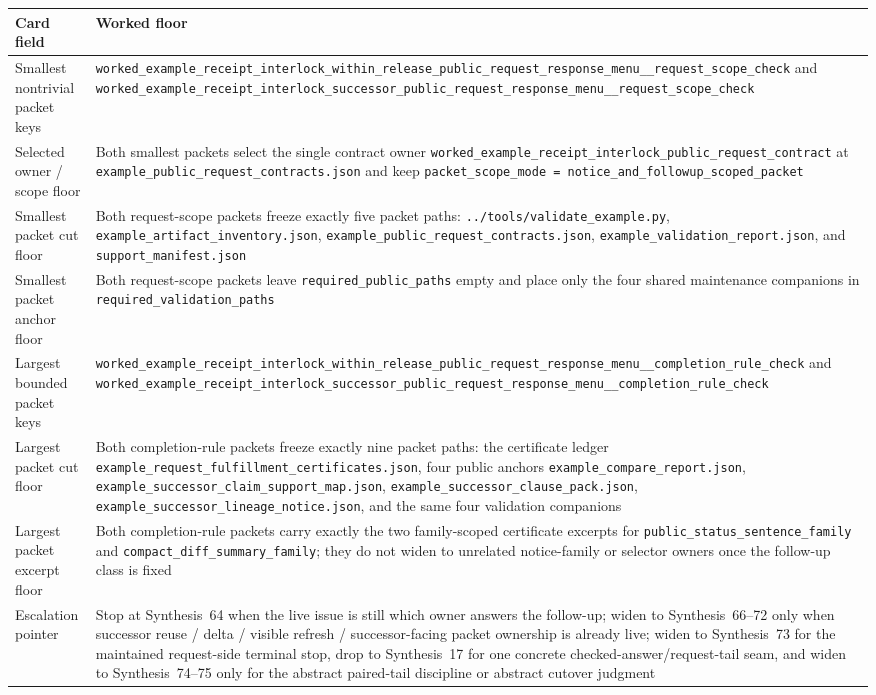 \documentclass[11pt]{article}
\begin{document}
\begin{table}[t]
\centering
\footnotesize
\begin{tabularx}{\linewidth}{@{}Z Y@{}}
\toprule
Card field & Worked floor \\
\midrule
Smallest nontrivial packet keys & \nolinkurl{worked_example_receipt_interlock_within_release_public_request_response_menu__request_scope_check} and \nolinkurl{worked_example_receipt_interlock_successor_public_request_response_menu__request_scope_check} \\
Selected owner / scope floor & Both smallest packets select the single contract owner \nolinkurl{worked_example_receipt_interlock_public_request_contract} at \nolinkurl{example_public_request_contracts.json} and keep \nolinkurl{packet_scope_mode = notice_and_followup_scoped_packet} \\
Smallest packet cut floor & Both request-scope packets freeze exactly five packet paths: \nolinkurl{../tools/validate_example.py}, \nolinkurl{example_artifact_inventory.json}, \nolinkurl{example_public_request_contracts.json}, \nolinkurl{example_validation_report.json}, and \nolinkurl{support_manifest.json} \\
Smallest packet anchor floor & Both request-scope packets leave \nolinkurl{required_public_paths} empty and place only the four shared maintenance companions in \nolinkurl{required_validation_paths} \\
Largest bounded packet keys & \nolinkurl{worked_example_receipt_interlock_within_release_public_request_response_menu__completion_rule_check} and \nolinkurl{worked_example_receipt_interlock_successor_public_request_response_menu__completion_rule_check} \\
Largest packet cut floor & Both completion-rule packets freeze exactly nine packet paths: the certificate ledger \nolinkurl{example_request_fulfillment_certificates.json}, four public anchors \nolinkurl{example_compare_report.json}, \nolinkurl{example_successor_claim_support_map.json}, \nolinkurl{example_successor_clause_pack.json}, \nolinkurl{example_successor_lineage_notice.json}, and the same four validation companions \\
Largest packet excerpt floor & Both completion-rule packets carry exactly the two family-scoped certificate excerpts for \nolinkurl{public_status_sentence_family} and \nolinkurl{compact_diff_summary_family}; they do not widen to unrelated notice-family or selector owners once the follow-up class is fixed \\
Escalation pointer & Stop at Synthesis~64 when the live issue is still which owner answers the follow-up; widen to Synthesis~66--72 only when successor reuse / delta / visible refresh / successor-facing packet ownership is already live; widen to Synthesis~73 for the maintained request-side terminal stop, drop to Synthesis~17 for one concrete checked-answer/request-tail seam, and widen to Synthesis~74--75 only for the abstract paired-tail discipline or abstract cutover judgment \\

\end{tabularx}
\end{table}
\end{document}
